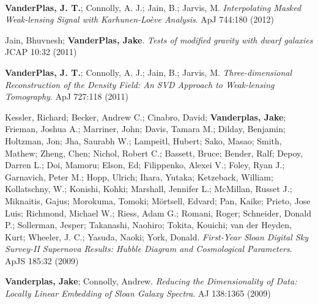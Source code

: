 {\\
\begin{packed_itemize}
   \item {\bf VanderPlas, J. T.}; Connolly, A. J.; Jain, B.; Jarvis, M.
         {\it Interpolating Masked Weak-lensing Signal
          with Karhunen-Loève Analysis}.  ApJ 744:180 (2012)
   \item Jain, Bhuvnesh; {\bf VanderPlas, Jake}.
         {\it Tests of modified gravity with dwarf galaxies}
         JCAP 10:32 (2011)
   \item {\bf VanderPlas, J. T.}; Connolly, A. J.; Jain, B.; Jarvis, M.
         {\it Three-dimensional Reconstruction of the Density Field:
              An SVD Approach to Weak-lensing Tomography}.
         ApJ 727:118 (2011)
   \item Kessler, Richard; Becker, Andrew C.; Cinabro, David;
         {\bf Vanderplas, Jake}; Frieman, Joshua A.; Marriner, John;
         Davis, Tamara M.; Dilday, Benjamin; Holtzman, Jon; Jha, Saurabh W.;
         Lampeitl, Hubert; Sako, Masao; Smith, Mathew; Zheng, Chen;
         Nichol, Robert C.; Bassett, Bruce; Bender, Ralf; Depoy, Darren L.;
         Doi, Mamoru; Elson, Ed; Filippenko, Alexei V.; Foley, Ryan J.;
         Garnavich, Peter M.; Hopp, Ulrich; Ihara, Yutaka; Ketzeback, William;
         Kollatschny, W.; Konishi, Kohki; Marshall, Jennifer L.;
         McMillan, Russet J.; Miknaitis, Gajus; Morokuma, Tomoki;
         Mörtsell, Edvard; Pan, Kaike; Prieto, Jose Luis; Richmond, Michael W.;
         Riess, Adam G.; Romani, Roger; Schneider, Donald P.;
         Sollerman, Jesper; Takanashi, Naohiro; Tokita, Kouichi;
         van der Heyden, Kurt; Wheeler, J. C.; Yasuda, Naoki; York, Donald.
         {\it First-Year Sloan Digital Sky Survey-II Supernova Results:
           Hubble Diagram and Cosmological Parameters}.
         ApJS 185:32 (2009)
   \item {\bf Vanderplas, Jake}; Connolly, Andrew.
         {\it Reducing the Dimensionality of Data: Locally Linear Embedding
              of Sloan Galaxy Spectra}.
         AJ 138:1365 (2009)
\end{packed_itemize}

}
